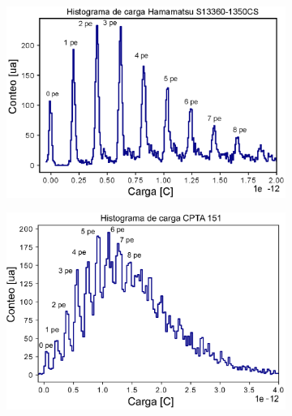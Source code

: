 \begin{figure}[h!]
     \centering
        \caption{Forma característica de los Histogramas de carga, el primer lóbulo corresponde al pedestal y los posteriores corresponden a múltiplos enteros de 1 p.e. Este histograma se obtuvo a una temperatura de 25 $^\circ$C.}     
     \begin{subfigure}[b]{0.49\textwidth}
         \centering
         \includegraphics[width=1.1\textwidth]{Images/Charge_13360.eps}
         \label{fig:charge_1360}
     \end{subfigure}
     \begin{subfigure}[b]{0.49\textwidth}
         \centering
         \includegraphics[width=1.1\textwidth]{Images/Charge_cpta.eps}
         \label{fig:charge_cpta}
     \end{subfigure}
        \label{fig:charge}
\end{figure}
